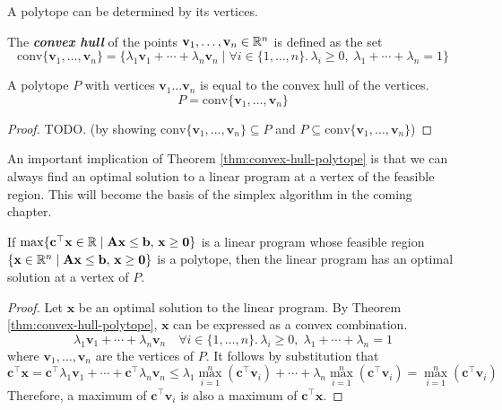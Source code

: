 A polytope can be determined by its vertices.

\begin{definition} 
    The \textit{\textbf{convex hull}} of the points $\mathbf{v}_1,\ldots,\mathbf{v}_n \in \mathbb{R}^n$ is defined as the set
    $$
    \mathrm{conv} \{\mathbf{v}_1,\ldots,\mathbf{v}_n\} = \{ \lambda_1 \mathbf{v}_1 + \cdots + \lambda_n \mathbf{v}_n \mid \forall i \in \{1,\ldots,n\}.\, \lambda_i \geq 0,\; \lambda_1+\cdots+\lambda_n = 1 \}
    $$
\end{definition}

\begin{theorem} \label{thm:convex-hull-polytope}
    A polytope $P$ with vertices $\mathbf{v}_1 \ldots \mathbf{v}_n$ is equal to the convex hull of the vertices.
    $$
    P = \mathrm{conv} \{\mathbf{v}_1,\ldots,\mathbf{v}_n\}
    $$
\end{theorem}

\begin{proof}
    TODO. (by showing $\mathrm{conv} \{\mathbf{v}_1,\ldots,\mathbf{v}_n\} \subseteq P$ and $P \subseteq \mathrm{conv} \{\mathbf{v}_1,\ldots,\mathbf{v}_n\}$)
\end{proof}

An important implication of Theorem \ref{thm:convex-hull-polytope} is that we can always find an optimal solution to a linear program at a vertex of the feasible region. This will become the basis of the simplex algorithm in the coming chapter.

\begin{theorem}
    If $\max \{ \mathbf{c}^\top \mathbf{x} \in \mathbb{R} \mid \mathbf{A}\mathbf{x} \leq \mathbf{b},\, \mathbf{x} \geq \textbf{0} \}$ is a linear program whose feasible region $\{ \mathbf{x} \in \mathbb{R}^n \mid \mathbf{A}\mathbf{x} \leq \mathbf{b},\, \mathbf{x} \geq \textbf{0} \}$ is a polytope, then the linear program has an optimal solution at a vertex of $P$.
\end{theorem}

\begin{proof}
    Let $\mathbf{x}$ be an optimal solution to the linear program. By Theorem \ref{thm:convex-hull-polytope}, $\mathbf{x}$ can be expressed as a convex combination.
    $$
    \lambda_1 \mathbf{v}_1 + \cdots + \lambda_n \mathbf{v}_n \quad \forall i \in \{1,\ldots,n\}.\, \lambda_i \geq 0,\; \lambda_1+\cdots+\lambda_n = 1
    $$
    where $\mathbf{v}_1,\ldots,\mathbf{v}_n$ are the vertices of $P$. It follows by substitution that
    $$
    \mathbf{c}^\top \mathbf{x} = \mathbf{c}^\top \lambda_1 \mathbf{v}_1 + \cdots + \mathbf{c}^\top \lambda_n \mathbf{v}_n \leq  \lambda_1 \max_{i=1}^n (\mathbf{c}^\top \mathbf{v}_i) + \cdots + \lambda_n \max_{i=1}^n (\mathbf{c}^\top \mathbf{v}_i) = \max_{i=1}^n (\mathbf{c}^\top \mathbf{v}_i)
    $$
    Therefore, a maximum of $\mathbf{c}^\top \mathbf{v}_i$ is also a maximum of $\mathbf{c}^\top \mathbf{x}$.
\end{proof}